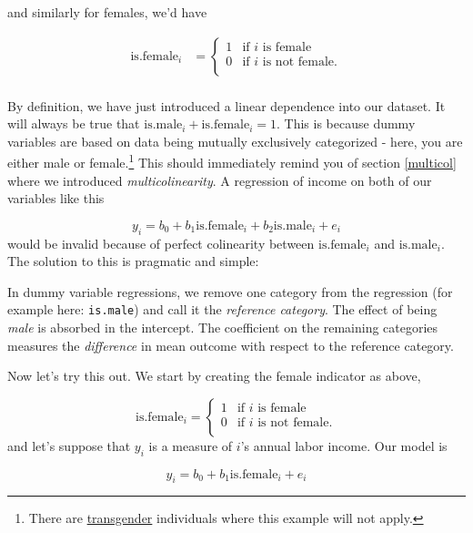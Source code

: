 \documentclass[]{book}
\let\rmarkdownfootnote\footnote%
\def\footnote{\protect\rmarkdownfootnote}
\newenvironment{tip}{\begin{tcolorbox}[colback=green!5!white,colframe=green]}{\end{tcolorbox}}
\begin{document}
and similarly for females, we'd have

\begin{align*}
\text{is.female}_i &=  \begin{cases}
                    1 & \text{if }i\text{ is female} \\
                    0 & \text{if }i\text{ is not female}. \\
                 \end{cases} \\
\end{align*}

By definition, we have just introduced a linear dependence into our
dataset. It will always be true that
\(\text{is.male}_i + \text{is.female}_i = 1\). This is because dummy
variables are based on data being mutually exclusively categorized -
here, you are either male or female.\footnote{There are
  \href{https://en.wikipedia.org/wiki/Transgender}{transgender}
  individuals where this example will not apply.} This should
immediately remind you of section \ref{multicol} where we introduced
\emph{multicolinearity}. A regression of income on both of our variables
like this

\[
y_i = b_0 + b_1 \text{is.female}_i + b_2 \text{is.male}_i + e_i
\] would be invalid because of perfect colinearity between
\(\text{is.female}_i\) and \(\text{is.male}_i\). The solution to this is
pragmatic and simple:

\begin{tip}
In dummy variable regressions, we remove one category from the
regression (for example here: \texttt{is.male}) and call it the
\emph{reference category}. The effect of being \emph{male} is absorbed
in the intercept. The coefficient on the remaining categories measures
the \emph{difference} in mean outcome with respect to the reference
category.
\end{tip}

Now let's try this out. We start by creating the female indicator as
above,

\[
\text{is.female}_i = \begin{cases}
          1 & \text{if }i\text{ is female} \\
            0 & \text{if }i\text{ is not female}. \\
   \end{cases}
\] and let's suppose that \(y_i\) is a measure of \(i\)'s annual labor
income. Our model is

\begin{equation}
y_i = b_0 + b_1 \text{is.female}_i + e_i \label{eq:dummy-reg}
\end{equation}
\end{document}
